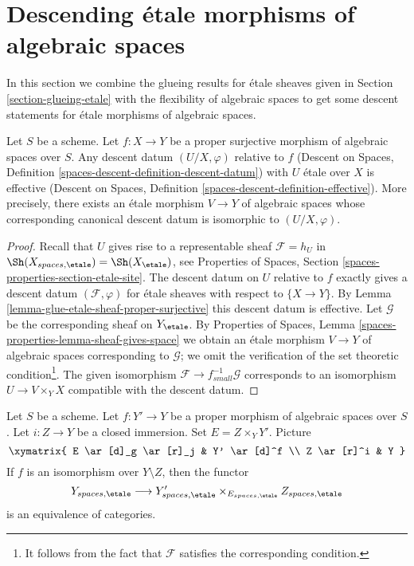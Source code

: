 \section{Descending \'etale morphisms of algebraic spaces}
\label{section-descending-etale}

\noindent
In this section we combine the glueing results for \'etale sheaves given in
Section \ref{section-glueing-etale} with the flexibility of algebraic spaces
to get some descent statements for \'etale morphisms of algebraic spaces.

\begin{lemma}
\label{lemma-descend-etale-proper-surjective}
Let $S$ be a scheme. Let $f : X \to Y$ be a proper surjective morphism
of algebraic spaces over $S$. Any descent datum $(U/X, \varphi)$ relative to $f$
(Descent on Spaces, Definition \ref{spaces-descent-definition-descent-datum})
with $U$ \'etale over $X$ is effective
(Descent on Spaces, Definition \ref{spaces-descent-definition-effective}).
More precisely, there exists an \'etale morphism $V \to Y$ of algebraic spaces
whose corresponding canonical descent datum is isomorphic to $(U/X, \varphi)$.
\end{lemma}

\begin{proof}
Recall that $U$ gives rise to a representable sheaf
$\mathcal{F} = h_U$ in $\Sh(X_{spaces, \etale}) = \Sh(X_\etale)$, see
Properties of Spaces, Section \ref{spaces-properties-section-etale-site}.
The descent datum on $U$ relative to $f$
exactly gives a descent datum $(\mathcal{F}, \varphi)$
for \'etale sheaves with respect to $\{X \to Y\}$.
By Lemma \ref{lemma-glue-etale-sheaf-proper-surjective}
this descent datum is effective.
Let $\mathcal{G}$ be the corresponding sheaf on $Y_\etale$.
By Properties of Spaces, Lemma \ref{spaces-properties-lemma-sheaf-gives-space}
we obtain an \'etale morphism $V \to Y$ of algebraic spaces
corresponding to $\mathcal{G}$; we omit the verification of
the set theoretic condition\footnote{It follows from the
fact that $\mathcal{F}$ satisfies the corresponding condition.}.
The given isomorphism $\mathcal{F} \to f_{small}^{-1}\mathcal{G}$
corresponds to an isomorphism $U \to V \times_Y X$ compatible
with the descent datum.
\end{proof}

\begin{lemma}
\label{lemma-glue-etale-space-modification}
Let $S$ be a scheme. Let $f : Y' \to Y$ be a proper morphism of
algebraic spaces over $S$. Let $i : Z \to Y$
be a closed immersion. Set $E = Z \times_Y Y'$. Picture
$$
\xymatrix{
E \ar[d]_g \ar[r]_j & Y' \ar[d]^f \\
Z \ar[r]^i & Y
}
$$
If $f$ is an isomorphism over $Y \setminus Z$, then the functor
$$
Y_{spaces, \etale}
\longrightarrow
Y'_{spaces, \etale} \times_{E_{spaces, \etale}} Z_{spaces, \etale}
$$
is an equivalence of categories.
\end{lemma}

